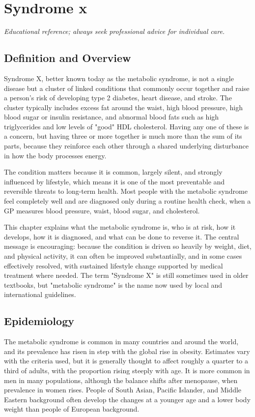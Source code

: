 \chapter{Syndrome x}

\medskip
\noindent\textit{Educational reference; always seek professional advice for individual care.}

\section*{Definition and Overview}
Syndrome X, better known today as the metabolic syndrome, is not a single disease but a cluster of linked conditions that commonly occur together and raise a person's risk of developing type 2 diabetes, heart disease, and stroke. The cluster typically includes excess fat around the waist, high blood pressure, high blood sugar or insulin resistance, and abnormal blood fats such as high triglycerides and low levels of "good" HDL cholesterol. Having any one of these is a concern, but having three or more together is much more than the sum of its parts, because they reinforce each other through a shared underlying disturbance in how the body processes energy.

The condition matters because it is common, largely silent, and strongly influenced by lifestyle, which means it is one of the most preventable and reversible threats to long-term health. Most people with the metabolic syndrome feel completely well and are diagnosed only during a routine health check, when a GP measures blood pressure, waist, blood sugar, and cholesterol.

This chapter explains what the metabolic syndrome is, who is at risk, how it develops, how it is diagnosed, and what can be done to reverse it. The central message is encouraging: because the condition is driven so heavily by weight, diet, and physical activity, it can often be improved substantially, and in some cases effectively resolved, with sustained lifestyle change supported by medical treatment where needed. The term "Syndrome X" is still sometimes used in older textbooks, but "metabolic syndrome" is the name now used by local and international guidelines.

\section*{Epidemiology}
The metabolic syndrome is common in many countries and around the world, and its prevalence has risen in step with the global rise in obesity. Estimates vary with the criteria used, but it is generally thought to affect roughly a quarter to a third of adults, with the proportion rising steeply with age. It is more common in men in many populations, although the balance shifts after menopause, when prevalence in women rises. People of South Asian, Pacific Islander, and Middle Eastern background often develop the changes at a younger age and a lower body weight than people of European background.

